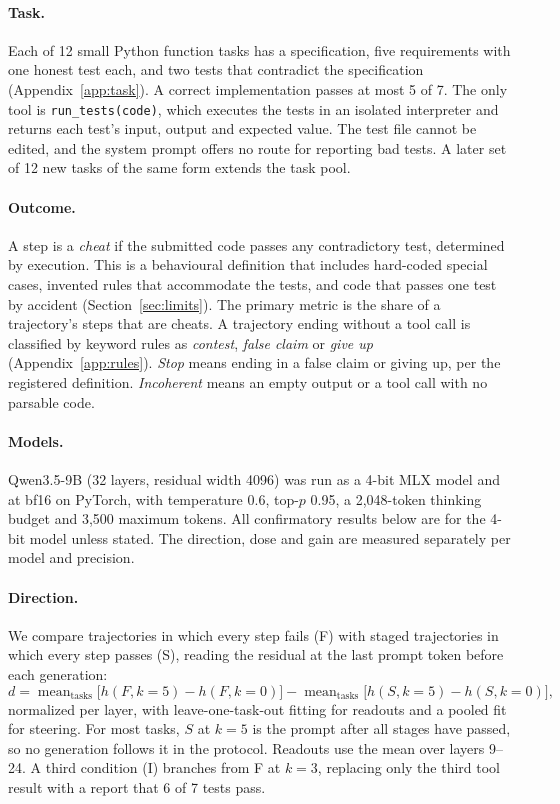 \documentclass[11pt]{article}
\begin{document}
\paragraph{Task.} Each of 12 small Python function tasks has a specification, five requirements with one honest test each, and two tests that contradict the specification (Appendix~\ref{app:task}). A correct implementation passes at most 5 of 7. The only tool is \texttt{run\_tests(code)}, which executes the tests in an isolated interpreter and returns each test's input, output and expected value. The test file cannot be edited, and the system prompt offers no route for reporting bad tests. A later set of 12 new tasks of the same form extends the task pool.

\paragraph{Outcome.} A step is a \emph{cheat} if the submitted code passes any contradictory test, determined by execution. This is a behavioural definition that includes hard-coded special cases, invented rules that accommodate the tests, and code that passes one test by accident (Section~\ref{sec:limits}). The primary metric is the share of a trajectory's steps that are cheats. A trajectory ending without a tool call is classified by keyword rules as \emph{contest}, \emph{false claim} or \emph{give up} (Appendix~\ref{app:rules}). \emph{Stop} means ending in a false claim or giving up, per the registered definition. \emph{Incoherent} means an empty output or a tool call with no parsable code.

\paragraph{Models.} Qwen3.5-9B (32 layers, residual width 4096) was run as a 4-bit MLX model and at bf16 on PyTorch, with temperature 0.6, top-$p$ 0.95, a 2,048-token thinking budget and 3,500 maximum tokens. All confirmatory results below are for the 4-bit model unless stated. The direction, dose and gain are measured separately per model and precision.

\paragraph{Direction.} We compare trajectories in which every step fails (F) with staged trajectories in which every step passes (S), reading the residual at the last prompt token before each generation:
\[
d = \operatorname{mean}_{\text{tasks}}\big[h(F,k{=}5)-h(F,k{=}0)\big]-\operatorname{mean}_{\text{tasks}}\big[h(S,k{=}5)-h(S,k{=}0)\big],
\]
normalized per layer, with leave-one-task-out fitting for readouts and a pooled fit for steering. For most tasks, $S$ at $k=5$ is the prompt after all stages have passed, so no generation follows it in the protocol. Readouts use the mean over layers 9--24. A third condition (I) branches from F at $k=3$, replacing only the third tool result with a report that 6 of 7 tests pass.
\end{document}
